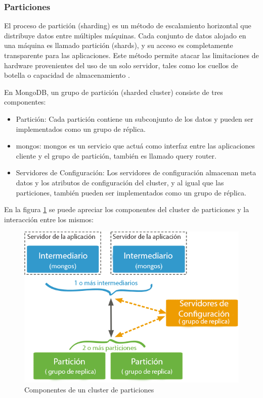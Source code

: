 \subsubsection{Particiones}

El proceso de partición (sharding) es un método de escalamiento horizontal que distribuye datos entre múltiples máquinas.
Cada conjunto de datos alojado en una máquina es llamado partición (shards), y su acceso es completamente transparente para las aplicaciones.
Este método permite atacar las limitaciones de hardware provenientes del uso de un solo servidor, tales como los cuellos de botella o capacidad de almacenamiento \cite{13}.

En MongoDB, un grupo de partición (sharded cluster) consiste de tres componentes:

\begin{itemize}
\item Partición: Cada partición contiene un subconjunto de los datos y pueden ser implementados como un grupo de réplica.

\item mongos: mongos es un servicio que actuá como interfaz entre las aplicaciones cliente y el grupo de partición, también es llamado
query router.

\item Servidores de Configuración: Los servidores de configuración almacenan meta datos y los atributos de configuración del cluster, y
al igual que las particiones, también pueden ser implementados como un grupo de réplica.
\end{itemize}

En la figura \ref{fig:sharding} se puede apreciar los componentes del cluster de particiones y la interacción entre los mismos:

\begin{figure}[H]
	\centering
		\includegraphics[width=.7\textwidth]{figures/sharding}
	\caption{Componentes de un cluster de particiones}
	\label{fig:sharding}
\end{figure}

